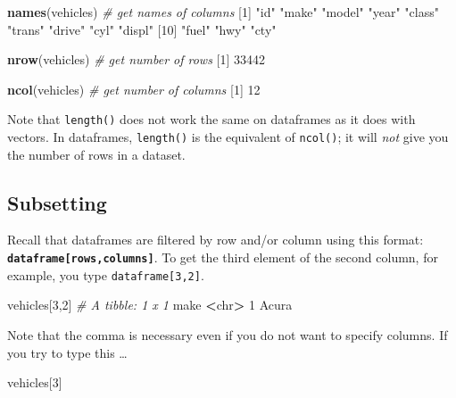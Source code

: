 \documentclass[
]{book}
\newenvironment{Shaded}{\begin{snugshade}}{\end{snugshade}}
\newcommand{\CommentTok}[1]{\textcolor[rgb]{0.56,0.35,0.01}{\textit{#1}}}
\newcommand{\DecValTok}[1]{\textcolor[rgb]{0.00,0.00,0.81}{#1}}
\newcommand{\KeywordTok}[1]{\textcolor[rgb]{0.13,0.29,0.53}{\textbf{#1}}}
\newcommand{\NormalTok}[1]{#1}
\newcommand{\OperatorTok}[1]{\textcolor[rgb]{0.81,0.36,0.00}{\textbf{#1}}}
\newcommand{\StringTok}[1]{\textcolor[rgb]{0.31,0.60,0.02}{#1}}
\begin{document}
\begin{Shaded}
\begin{Highlighting}[]
\KeywordTok{names}\NormalTok{(vehicles) }\CommentTok{# get names of columns}
\NormalTok{ [}\DecValTok{1}\NormalTok{] }\StringTok{"id"}    \StringTok{"make"}  \StringTok{"model"} \StringTok{"year"}  \StringTok{"class"} \StringTok{"trans"} \StringTok{"drive"} \StringTok{"cyl"}   \StringTok{"displ"}
\NormalTok{[}\DecValTok{10}\NormalTok{] }\StringTok{"fuel"}  \StringTok{"hwy"}   \StringTok{"cty"}  

\KeywordTok{nrow}\NormalTok{(vehicles) }\CommentTok{# get number of rows}
\NormalTok{[}\DecValTok{1}\NormalTok{] }\DecValTok{33442}

\KeywordTok{ncol}\NormalTok{(vehicles) }\CommentTok{# get number of columns}
\NormalTok{[}\DecValTok{1}\NormalTok{] }\DecValTok{12}
\end{Highlighting}
\end{Shaded}

Note that \texttt{length()} does not work the same on dataframes as it does with vectors. In dataframes, \texttt{length()} is the equivalent of \texttt{ncol()}; it will \emph{not} give you the number of rows in a dataset.

\hypertarget{subsetting}{%
\subsection*{Subsetting}\label{subsetting}}

Recall that dataframes are filtered by row and/or column using this format: \textbf{\texttt{dataframe{[}rows,columns{]}}}. To get the third element of the second column, for example, you type \texttt{dataframe{[}3,2{]}}.

\begin{Shaded}
\begin{Highlighting}[]
\NormalTok{vehicles[}\DecValTok{3}\NormalTok{,}\DecValTok{2}\NormalTok{]}
\CommentTok{# A tibble: 1 x 1}
\NormalTok{  make }
  \OperatorTok{<}\NormalTok{chr}\OperatorTok{>}
\DecValTok{1}\NormalTok{ Acura}
\end{Highlighting}
\end{Shaded}

Note that the comma is necessary even if you do not want to specify columns. If you try to type this \ldots{}

\begin{Shaded}
\begin{Highlighting}[]
\NormalTok{vehicles[}\DecValTok{3}\NormalTok{]}
\end{Highlighting}
\end{Shaded}
\end{document}
